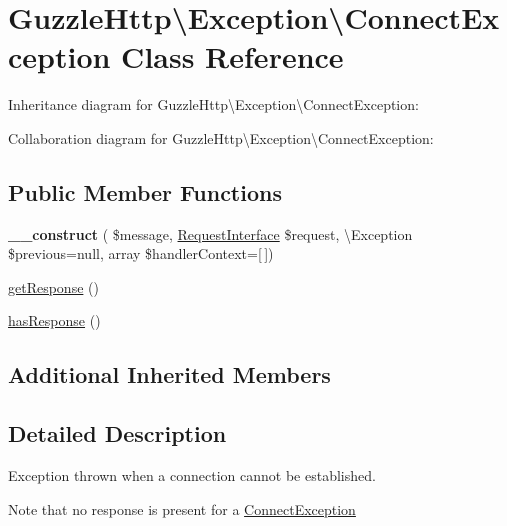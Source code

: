 \hypertarget{classGuzzleHttp_1_1Exception_1_1ConnectException}{}\section{Guzzle\+Http\textbackslash{}Exception\textbackslash{}Connect\+Exception Class Reference}
\label{classGuzzleHttp_1_1Exception_1_1ConnectException}


Inheritance diagram for Guzzle\+Http\textbackslash{}Exception\textbackslash{}Connect\+Exception\+:


Collaboration diagram for Guzzle\+Http\textbackslash{}Exception\textbackslash{}Connect\+Exception\+:
\subsection*{Public Member Functions}
\begin{DoxyCompactItemize}
\item 
\mbox{\label{classGuzzleHttp_1_1Exception_1_1ConnectException_a696151b780e4f2d51123d85c22ebabe3}} 
{\bfseries \+\_\+\+\_\+construct} ( \$message, \hyperlink{interfacePsr_1_1Http_1_1Message_1_1RequestInterface}{Request\+Interface} \$request, \textbackslash{}Exception \$previous=null, array \$handler\+Context=\mbox{[}$\,$\mbox{]})
\item 
\hyperlink{classGuzzleHttp_1_1Exception_1_1ConnectException_aa5e5fe243f9f4f314b1ba2cc16ef3497}{get\+Response} ()
\item 
\hyperlink{classGuzzleHttp_1_1Exception_1_1ConnectException_a4829b9157171d7c801c2b80a690b11f2}{has\+Response} ()
\end{DoxyCompactItemize}
\subsection*{Additional Inherited Members}


\subsection{Detailed Description}
Exception thrown when a connection cannot be established.

Note that no response is present for a \hyperlink{classGuzzleHttp_1_1Exception_1_1ConnectException}{Connect\+Exception} 

